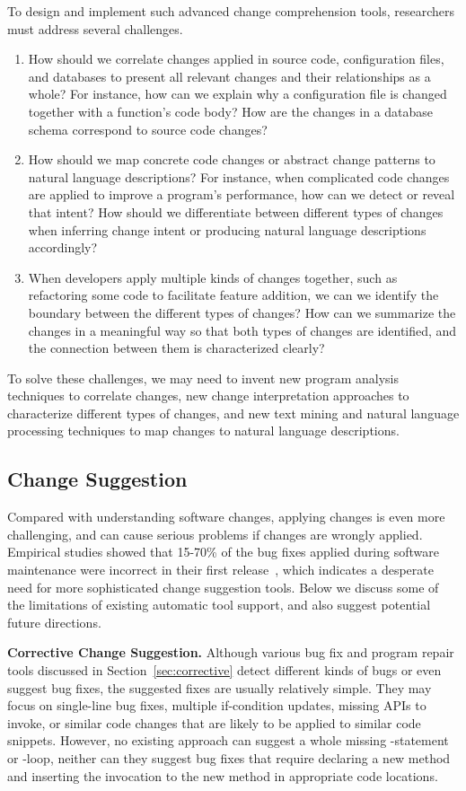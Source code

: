To design and implement such advanced change comprehension tools, researchers must address several challenges. 
\begin{enumerate}
\item How should we correlate changes applied in source code, configuration files, and databases to present all relevant changes and their relationships as a whole? For instance, how can we explain why a configuration file is changed together with a function's code body? How are the changes in a database schema correspond to source code changes?
\item How should we map concrete code changes or abstract change patterns to natural language descriptions? For instance, when complicated code changes are applied to improve a program's  performance, how can we detect or reveal that intent? How should we differentiate between different types of changes when inferring change intent or producing natural language descriptions accordingly?
\item When developers apply multiple kinds of changes together, such as refactoring some code to facilitate feature addition, we can we identify the boundary between the different types of changes? How can we summarize the changes in a meaningful way so that both types of changes are identified, and the connection between them is characterized clearly? 
\end{enumerate}
To solve these challenges, we may need to invent new program analysis techniques to correlate changes, new change interpretation approaches to characterize different types of changes,
and new text mining and natural language processing techniques to map changes to natural language descriptions.

\subsection{Change Suggestion}
Compared with understanding software changes, applying changes is even more challenging, and can cause serious problems if changes are wrongly applied. Empirical studies showed that 15-70\% of the bug fixes applied during software maintenance were incorrect in their first release~\cite{Sidiroglou:2007:BP,Yin2011:FBB}, which indicates a desperate need for more sophisticated change suggestion tools. 
Below we discuss some of the limitations of existing automatic tool support, and also suggest potential future directions.


\textbf{Corrective Change Suggestion.} Although various bug fix and program repair tools discussed in Section~\ref{sec:corrective} detect different kinds of bugs or even suggest bug fixes, the suggested fixes are usually relatively simple. They may focus on single-line bug fixes, multiple if-condition updates, missing APIs to invoke, or similar code changes that are likely to be applied to similar code snippets. However, no existing approach can suggest a whole missing -statement or -loop, neither can they suggest bug fixes that require declaring a new method and inserting the invocation to the new method in appropriate code locations.

